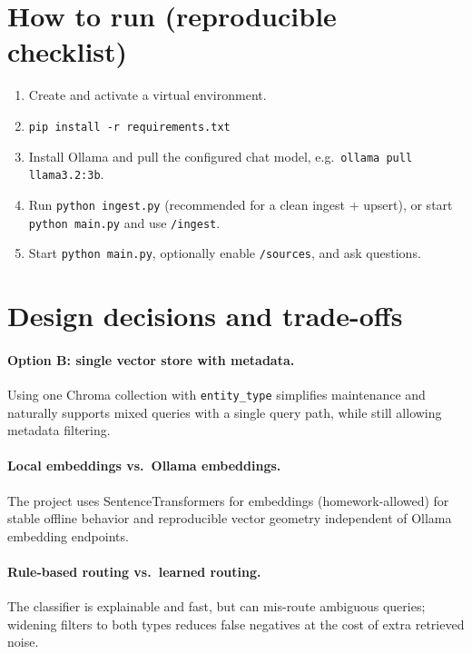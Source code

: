 \documentclass[11pt,a4paper]{article}
\begin{document}
\section{How to run (reproducible checklist)}

\begin{enumerate}[leftmargin=*]
  \item Create and activate a virtual environment.
  \item \texttt{pip install -r requirements.txt}
  \item Install Ollama and pull the configured chat model, e.g.\ \texttt{ollama pull llama3.2:3b}.
  \item Run \texttt{python ingest.py} (recommended for a clean ingest + upsert), or start
        \texttt{python main.py} and use \texttt{/ingest}.
  \item Start \texttt{python main.py}, optionally enable \texttt{/sources}, and ask questions.
\end{enumerate}

\section{Design decisions and trade-offs}

\paragraph{Option B: single vector store with metadata.}
Using one Chroma collection with \texttt{entity\_type} simplifies maintenance and naturally
supports mixed queries with a single query path, while still allowing metadata filtering.

\paragraph{Local embeddings vs.\ Ollama embeddings.}
The project uses SentenceTransformers for embeddings (homework-allowed) for stable offline
behavior and reproducible vector geometry independent of Ollama embedding endpoints.

\paragraph{Rule-based routing vs.\ learned routing.}
The classifier is explainable and fast, but can mis-route ambiguous queries; widening filters
to both types reduces false negatives at the cost of extra retrieved noise.
\end{document}
